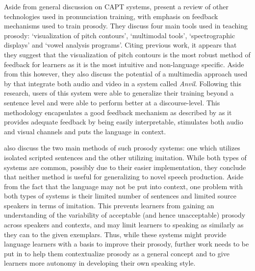 \documentclass
[
    a4paper,
    twoside,
    12pt,
]
{report}
\begin{document}
Aside from general discussion on CAPT systems, \textcite{chun2008}
present a review of other technologies used in pronunciation training,
with emphasis on feedback mechanisms used to train prosody. They discuss
four main tools used in teaching prosody: `visualization of pitch
contours', `multimodal tools', `spectrographic displays' and `vowel
analysis programs'. Citing previous work, it appears that they suggest
that the visualization of pitch contours is the most robust method of
feedback for learners as it is the most intuitive and non-language
specific. Aside from this however, they also discuss the potential of a
multimedia approach used by \textcite{hardison2005} that integrate both
audio and video in a system called \textit{Anvil}. Following this
research, users of this system were able to generalize their training
beyond a sentence level and were able to perform better at a
discourse-level. This methodology encapsulates a good feedback mechanism
as described by \textcite{neri2002} as it provides adequate feedback by
being easily interpretable, stimulates both audio and visual channels
and puts the language in context.

\textcite{chun2008} also discuss the two main methods of such prosody
systems: one which utilizes isolated scripted sentences and the other
utilizing imitation. While both types of systems are common, possibly
due to their easier implementation, they conclude that neither method is
useful for generalizing to novel speech production. Aside from the fact
that the language may not be put into context, one problem with both
types of systems is their limited number of sentences and limited source
speakers in terms of imitation. This prevents learners from gaining an
understanding of the variability of acceptable (and hence unacceptable)
prosody across speakers and contexts, and may limit learners to speaking
as similarly as they can to the given exemplars. Thus, while these
systems might provide language learners with a basis to improve their
prosody, further work needs to be put in to help them contextualize
prosody as a general concept and to give learners more autonomy in
developing their own speaking style.
\end{document}
